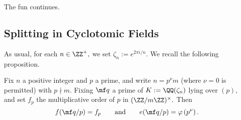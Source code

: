 













The fun continues.

\subsection{Splitting in Cyclotomic Fields}
As usual, for each $n\in\ZZ^+,$ we set $\zeta_n:=e^{2\pi i/n}.$ We recall the following proposition.
\begin{proposition}
	Fix $n$ a positive integer and $p$ a prime, and write $n=p^\nu m$ (where $\nu=0$ is permitted) with $p\nmid m.$ Fixing $\mf q$ a prime of $K:=\QQ(\zeta_n)$ lying over $(p),$ and set $f_p$ the multiplicative order of $p$ in $(\ZZ/m\ZZ)^\times.$ Then
	\[f(\mf q/p)=f_p\qquad\text{and}\qquad e(\mf q/p)=\varphi\left(p^\nu\right).\]
\end{proposition}

